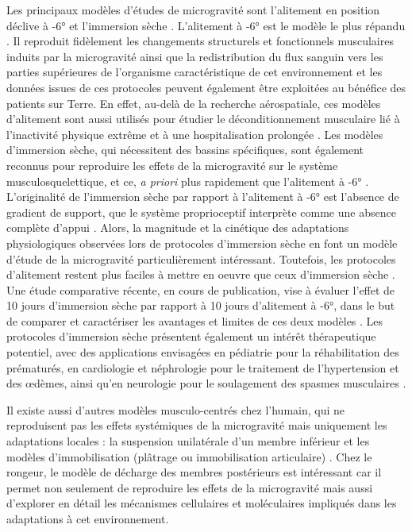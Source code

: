 \documentclass[11pt]{report}
\begin{document}
Les principaux modèles d'études de microgravité sont l'alitement en position déclive à -6° \parencite{hedge_implementation_2022} et l'immersion sèche \parencite{tomilovskaya_dry_2019}. L'alitement à -6° est le modèle le plus répandu \parencite{pavy-le_traon_space_2007}. Il reproduit fidèlement les changements structurels et fonctionnels musculaires induits par la microgravité ainsi que la redistribution du flux sanguin vers les parties supérieures de l'organisme caractéristique de cet environnement \parencite{Hargens2016Apr} et les données issues de ces protocoles peuvent également être exploitées au bénéfice des patients sur Terre. En effet, au-delà de la recherche aérospatiale, ces modèles d'alitement sont aussi utilisés pour étudier le déconditionnement musculaire lié à l'inactivité physique extrême et à une hospitalisation prolongée \parencite{hedge_implementation_2022}. Les modèles d'immersion sèche, qui nécessitent des bassins spécifiques, sont également reconnus pour reproduire les effets de la microgravité sur le système musculosquelettique, et ce, \textit{a priori} plus rapidement que l'alitement à -6° \parencite{tomilovskaya_dry_2019,navasiolava_long-term_2011}. L'originalité de l'immersion sèche par rapport à l'alitement à -6° est l'absence de gradient de support, que le système proprioceptif interprète comme une absence complète d'appui \parencite{shenkman_cellular_2019}. Alors, la magnitude et la cinétique des adaptations physiologiques observées lors de protocoles d'immersion sèche en font un modèle d'étude de la microgravité particulièrement intéressant.
Toutefois, les protocoles d'alitement restent plus faciles à mettre en oeuvre que ceux d'immersion sèche \parencite{tomilovskaya_dry_2019}. Une étude comparative récente, en cours de publication, vise à évaluer l'effet de 10 jours d'immersion sèche par rapport à 10 jours d'alitement à -6°, dans le but de comparer et caractériser les avantages et limites de ces deux modèles \parencite{BibEntry2025Jul}. Les protocoles d'immersion sèche présentent également un intérêt thérapeutique potentiel, avec des applications envisagées en pédiatrie pour la réhabilitation des prématurés, en cardiologie et néphrologie pour le traitement de l'hypertension et des œdèmes, ainsi qu'en neurologie pour le soulagement des spasmes musculaires \parencite{navasiolava_long-term_2011}. 

Il existe aussi d'autres modèles musculo-centrés chez l'humain, qui ne reproduisent pas les effets systémiques de la microgravité mais uniquement les adaptations locales : la suspension unilatérale d'un membre inférieur \parencite{tesch_unilateral_2016} et les modèles d'immobilisation (plâtrage ou immobilisation articulaire) \parencite{adams_skeletal_2003}. Chez le rongeur, le modèle de décharge des membres postérieurs \parencite{globus_hindlimb_2016} est intéressant car il permet non seulement de reproduire les effets de la microgravité mais aussi d'explorer en détail les mécanismes cellulaires et moléculaires impliqués dans les adaptations à cet environnement.
\end{document}
